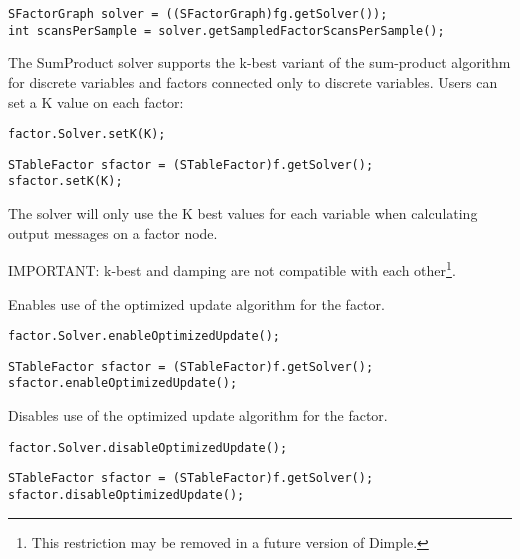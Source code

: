\ifjava
\begin{lstlisting}
SFactorGraph solver = ((SFactorGraph)fg.getSolver());
int scansPerSample = solver.getSampledFactorScansPerSample();
\end{lstlisting}
\fi




The SumProduct solver supports the k-best variant of the sum-product algorithm for discrete variables and factors connected only to discrete variables.  Users can set a K value on each factor:

\ifmatlab
\begin{lstlisting}
factor.Solver.setK(K);
\end{lstlisting}
\fi

\ifjava
\begin{lstlisting}
STableFactor sfactor = (STableFactor)f.getSolver();
sfactor.setK(K);
\end{lstlisting}
\fi


The solver will only use the K best values for each variable when calculating output messages on a factor node.

IMPORTANT: k-best and damping are not compatible with each other\footnote{This restriction may be removed in a future version of Dimple.}.


Enables use of the optimized update algorithm for the factor.

\ifmatlab
\begin{lstlisting}
factor.Solver.enableOptimizedUpdate();
\end{lstlisting}
\fi

\ifjava
\begin{lstlisting}
STableFactor sfactor = (STableFactor)f.getSolver();
sfactor.enableOptimizedUpdate();
\end{lstlisting}
\fi


Disables use of the optimized update algorithm for the factor.

\ifmatlab
\begin{lstlisting}
factor.Solver.disableOptimizedUpdate();
\end{lstlisting}
\fi

\ifjava
\begin{lstlisting}
STableFactor sfactor = (STableFactor)f.getSolver();
sfactor.disableOptimizedUpdate();
\end{lstlisting}
\fi

